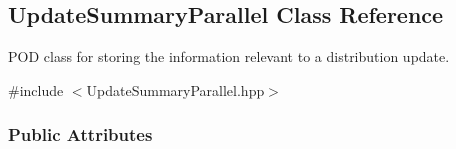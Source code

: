 \hypertarget{classDmpBbo_1_1UpdateSummaryParallel}{\subsection{Update\+Summary\+Parallel Class Reference}
\label{classDmpBbo_1_1UpdateSummaryParallel}
}


P\+O\+D class for storing the information relevant to a distribution update.  




{\ttfamily \#include $<$Update\+Summary\+Parallel.\+hpp$>$}

\subsubsection*{Public Attributes}
